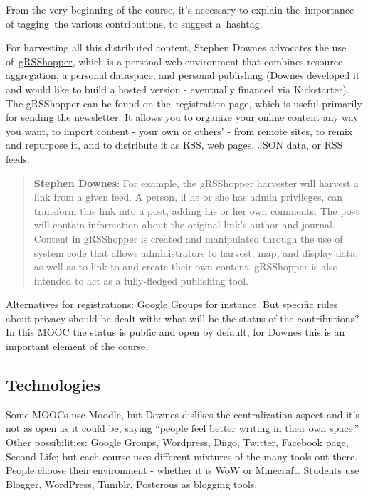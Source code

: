 From the very beginning of the course, it's necessary to explain
the~importance of tagging~the various contributions, to suggest
a~hashtag.

For harvesting all this distributed content, Stephen Downes advocates
the use of~\href{http://grsshopper.downes.ca/index.html}{gRSShopper},
which is a personal web environment that combines resource aggregation,
a personal dataspace, and personal publishing (Downes developed it and
would like to build a hosted version - eventually financed via
Kickstarter). The gRSShopper can be found on the~registration page,
which is useful primarily for sending the newsletter. It allows you to
organize your online content any way you want, to import content - your
own or others' - from remote sites, to remix and repurpose it, and to
distribute it as RSS, web pages, JSON data, or RSS feeds.

\begin{quote}
\textbf{Stephen Downes}: For example, the gRSShopper harvester will
harvest a link from a given feed. A person, if he or she has admin
privileges, can transform this link into a post, adding his or her own
comments. The post will contain information about the original link's
author and journal. Content in gRSShopper is created and manipulated
through the use of system code that allows administrators to harvest,
map, and display data, as well as to link to and create their own
content. gRSShopper is also intended to act as a fully-fledged
publishing tool.
\end{quote}

Alternatives for registrations: Google Groups for instance. But specific
rules about privacy should be dealt with: what will be the status of the
contributions? In this MOOC the status is public and open by default,
for Downes this is an important element of the course.

\subsection{Technologies}\label{technologies}

Some MOOCs use Moodle, but Downes dislikes the centralization aspect and
it's not as open as it could be, saying ``people feel better writing in
their own space.'' Other possibilities: Google Groups, Wordpress, Diigo,
Twitter, Facebook page, Second Life; but each course uses different
mixtures of the many tools out there. People choose their environment -
whether it is WoW or Minecraft. Students use Blogger, WordPress, Tumblr,
Posterous as blogging tools.

